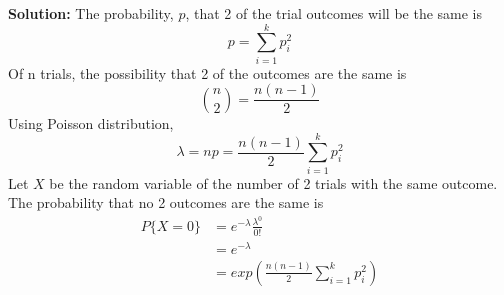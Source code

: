 \documentclass{report}
\begin{document}
\begin{enumerate}
{\bf Solution:} The probability, $p$, that 2 of the trial outcomes will be the same is
$$p=\sum_{i=1}^{k}p_i^2$$
Of n trials, the possibility that 2 of the outcomes are the same is
$${n \choose 2} =\frac{n(n-1)}{2}$$
Using Poisson distribution, 
$$\lambda = np = \frac{n(n-1)}{2}\sum_{i=1}^{k}p_i^2$$ 
Let $X$ be the random variable of the number of 2 trials with the same outcome. The probability that no 2 outcomes are the same is
\begin{align*}
    P\{ X=0\} &= e^{-\lambda}\frac{\lambda^0}{0!} \\
    &=e^{-\lambda} \\
    &=exp \left ( \frac{n(n-1)}{2}\sum_{i=1}^{k}p_i^2 \right)
\end{align*}

	
\end{enumerate}
\end{document}
